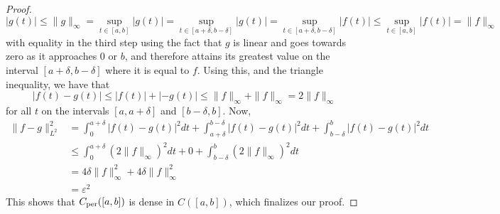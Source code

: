 \documentclass[../thesis.tex]{subfiles}
\begin{document}
\begin{proof}
    \begin{equation*}
        |g(t)| \leq \|g\|_{\infty} = \sup_{t\in[a,b]} |g(t)| = \sup_{t\in[a+\delta, b-\delta]} |g(t)| = \sup_{t\in[a+\delta, b-\delta]} |f(t)| \leq \sup_{t\in[a, b]} |f(t)| =\| f\|_{\infty}
    \end{equation*}
    with equality in the third step using the fact that $g$ is linear and goes towards zero as it approaches $0$ or $b$, and therefore attains its greatest value on the interval $[a+\delta,b-\delta]$ where it is equal to $f$. Using this, and the triangle inequality, we have that
    \begin{equation*}
        \left|f(t)-g(t) \right| \leq |f(t)| + |-g(t)| \leq \|f \|_{\infty} + \|f \|_{\infty} = 2 \|f \|_{\infty}
    \end{equation*}
    for all $t$ on the intervals $[a, a+\delta]$ and $[b-\delta,b]$. Now,
    \begin{align*}
        \| f-g \|_{L^2}^2 &=  \int_0^{a+\delta} \left|f(t)-g(t) \right|^2dt + \int_{a+\delta}^{b-\delta} \left|f(t)-g(t) \right|^2dt +\int_{b-\delta}^{b} \left|f(t)-g(t) \right|^2dt\\ 
        &\leq \int_0^{a+\delta} (2 \| f\|_\infty)^2dt + 0 +\int_{b-\delta}^{b} (2 \| f\|_\infty)^2dt\\
        &=  4 \delta \| f\|_\infty^2 + 4 \delta \| f\|_\infty^2\\ 
        &= \varepsilon^2
    \end{align*}
    This shows that $C_{\text{per}}([a,b])$ is dense in $C([a,b])$, which finalizes our proof.
\end{proof}
\end{document}
